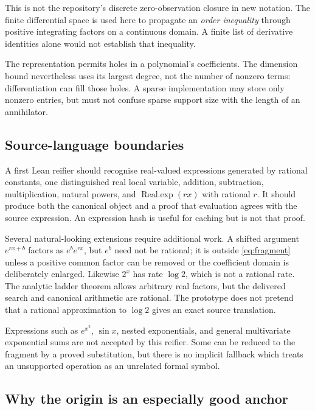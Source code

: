 This is not the repository's discrete zero-observation closure in new notation.
The finite differential space is used here to propagate an \emph{order
inequality} through positive integrating factors on a continuous domain. A
finite list of derivative identities alone would not establish that inequality.

The representation permits holes in a polynomial's coefficients. The dimension
bound nevertheless uses its largest degree, not the number of nonzero terms:
differentiation can fill those holes. A sparse implementation may store only
nonzero entries, but must not confuse sparse support size with the length of an
annihilator.

\subsection{Source-language boundaries}

A first Lean reifier should recognise real-valued expressions generated by
rational constants, one distinguished real local variable, addition,
subtraction, multiplication, natural powers, and
$\operatorname{Real.exp}(r x)$ with rational $r$. It should produce both the
canonical object and a proof that evaluation agrees with the source expression.
An expression hash is useful for caching but is not that proof.

Several natural-looking extensions require additional work. A shifted argument
$e^{r x+b}$ factors as $e^b e^{rx}$, but $e^b$ need not be rational; it is outside
\eqref{eq:fragment} unless a positive common factor can be removed or the
coefficient domain is deliberately enlarged. Likewise $2^x$ has rate $\log2$,
which is not a rational rate. The analytic ladder theorem allows arbitrary real
factors, but the delivered search and canonical arithmetic are rational. The
prototype does not pretend that a rational approximation to $\log2$ gives an
exact source translation.

Expressions such as $e^{x^2}$, $\sin x$, nested exponentials, and general
multivariate exponential sums are not accepted by this reifier. Some can be
reduced to the fragment by a proved substitution, but there is no implicit
fallback which treats an unsupported operation as an unrelated formal symbol.

\subsection{Why the origin is an especially good anchor}

